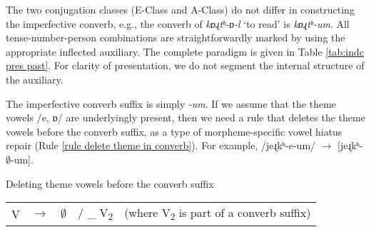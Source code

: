 The two conjugation classes (E-Class and A-Class) do not differ in constructing the imperfective converb, e.g., the converb of \textit{{kɒɻtʰ-ɒ-l}} `to read' is \textit{{kɒɻtʰ-um}}. All tense-number-person combinations are straightforwardly marked by using the appropriate inflected auxiliary. The complete paradigm is given in Table \ref{tab:indc pres past}. For clarity of presentation, we do not segment the internal structure of the auxiliary.\largerpage

The imperfective converb suffix is simply \textit{-um}. If we assume that the theme vowels /{{e, ɒ}}/ are underlyingly present, then we need a rule that deletes the theme vowels before the converb suffix, as a type of morpheme-specific vowel hiatus repair (Rule \ref{rule delete theme in converb}). For example, 	/{jeɻkʰ-e-um}/ $ \rightarrow$ [{jeɻkʰ-$\emptyset$-um}]. 

\begin{newruleblock}
	{Deleting theme vowels before the converb suffix}%
	
	\begin{center}
		
		\begin{tabular}{lllll}
			V & $\rightarrow$ & $\emptyset$ & / \_ V\textsubscript{2} & (where V\textsubscript{2} is part of a converb suffix)
			\\
		\end{tabular}
	\end{center}
\end{newruleblock}

